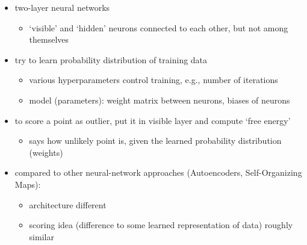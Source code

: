\documentclass[12pt]{article}
\begin{document}
\begin{itemize}[left=0pt, nosep]
	\item two-layer neural networks
	\begin{itemize}[left=0pt, nosep]
		\item `visible' and `hidden' neurons connected to each other, but not among themselves
	\end{itemize}
	\item try to learn probability distribution of training data
	\begin{itemize}[left=0pt, nosep]
		\item various hyperparameters control training, e.g., number of iterations
		\item model (parameters): weight matrix between neurons, biases of neurons
	\end{itemize}
	\item to score a point as outlier, put it in visible layer and compute `free energy'
	\begin{itemize}[left=0pt, nosep]
		\item says how unlikely point is, given the learned probability distribution (weights)
	\end{itemize}
	\item compared to other neural-network approaches (Autoencoders, Self-Organizing Maps):
	\begin{itemize}[left=0pt, nosep]
		\item architecture different
		\item scoring idea (difference to some learned representation of data) roughly similar
	\end{itemize}
\end{itemize}
\end{document}
